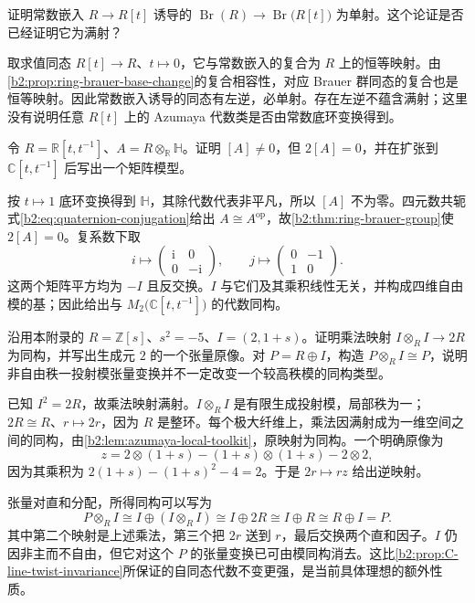 \begin{exercise}\label{b2:ex:C-polynomial-brauer-injection}
	证明常数嵌入 \(R\rightarrow R[t]\) 诱导的 \(\operatorname{Br}(R)\rightarrow\operatorname{Br}\bigl(R[t]\bigr)\) 为单射。这个论证是否已经证明它为满射？
\end{exercise}
\begin{solution}
	取求值同态 \(R[t]\rightarrow R\)、\(t\mapsto0\)，它与常数嵌入的复合为 \(R\) 上的恒等映射。由\cref{b2:prop:ring-brauer-base-change}的复合相容性，对应 Brauer 群同态的复合也是恒等映射。因此常数嵌入诱导的同态有左逆，必单射。存在左逆不蕴含满射；这里没有说明任意 \(R[t]\) 上的 Azumaya 代数类是否由常数底环变换得到。
\end{solution}

\begin{exercise}\label{b2:ex:C-quaternion-laurent}
	令 \(R=\mathbb R[t,t^{-1}]\)、\(A=R\otimes_{\mathbb R}\mathbb H\)。证明 \([A]\ne0\)，但 \(2[A]=0\)，并在扩张到 \(\mathbb C[t,t^{-1}]\) 后写出一个矩阵模型。
\end{exercise}
\begin{solution}
	按 \(t\mapsto1\) 底环变换得到 \(\mathbb H\)，其除代数代表非平凡，所以 \([A]\) 不为零。四元数共轭式\eqref{b2:eq:quaternion-conjugation}给出 \(A\cong A^{\mathrm{op}}\)，故\cref{b2:thm:ring-brauer-group}使 \(2[A]=0\)。复系数下取
	\[
		i\longmapsto\begin{pmatrix}\mathrm i&0\\0&-\mathrm i\end{pmatrix},
		\qquad
		j\longmapsto\begin{pmatrix}0&-1\\1&0\end{pmatrix}.
	\]
	这两个矩阵平方均为 \(-I\) 且反交换。\(I\) 与它们及其乘积线性无关，并构成四维自由模的基；因此给出与 \(M_2\bigl(\mathbb C[t,t^{-1}]\bigr)\) 的代数同构。
\end{solution}

\begin{exercise}\label{b2:ex:C-line-twist}
	沿用本附录的 \(R=\mathbb Z[s]\)、\(s^2=-5\)、\(I=(2,1+s)\)。证明乘法映射 \(I\otimes_RI\rightarrow2R\) 为同构，并写出生成元 \(2\) 的一个张量原像。对 \(P=R\oplus I\)，构造 \(P\otimes_RI\cong P\)，说明非自由秩一投射模张量变换并不一定改变一个较高秩模的同构类型。
\end{exercise}
\begin{solution}
	已知 \(I^2=2R\)，故乘法映射满射。\(I\otimes_RI\) 是有限生成投射模，局部秩为一；\(2R\cong R\)、\(r\mapsto2r\)，因为 \(R\) 是整环。每个极大纤维上，乘法因满射成为一维空间之间的同构，由\cref{b2:lem:azumaya-local-toolkit}，原映射为同构。一个明确原像为
	\[
		z=2\otimes(1+s)-(1+s)\otimes(1+s)-2\otimes2,
	\]
	因为其乘积为 \(2(1+s)-(1+s)^2-4=2\)。于是 \(2r\mapsto rz\) 给出逆映射。

	张量对直和分配，所得同构可以写为
	\[
		P\otimes_RI\cong I\oplus(I\otimes_RI) \cong I\oplus2R\cong I\oplus R\cong R\oplus I=P.
	\]
	其中第二个映射是上述乘法，第三个把 \(2r\) 送到 \(r\)，最后交换两个直和因子。\(I\) 仍因非主而不自由，但它对这个 \(P\) 的张量变换已可由模同构消去。这比\cref{b2:prop:C-line-twist-invariance}所保证的自同态代数不变更强，是当前具体理想的额外性质。
\end{solution}

